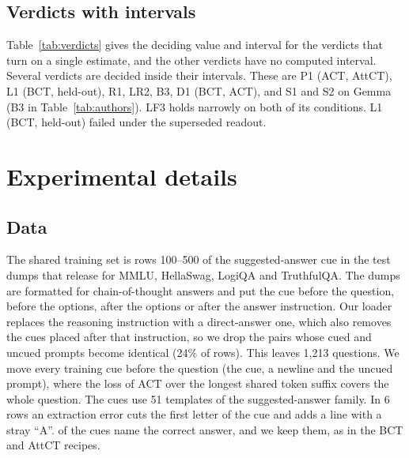 \documentclass[11pt]{article}
\makeatletter
\newcommand\appflush{\par\if@firstcolumn\else\ifx\@deferlist\@empty\else\ifdim\dimexpr\pagegoal-\pagetotal\relax<0.4\textheight \mbox{}\newpage\fi\fi\fi}
\newcommand{\gemma}{Gemma}\newcommand{\gemmafull}{Gemma-2-2B-it}
\makeatother
\begin{document}
\appflush
\subsection{Verdicts with intervals}
\begin{table}[t]\centering\scriptsize\setlength{\tabcolsep}{3pt}
\tabVerdicts
\caption{Pre-registered verdicts that turn on a single estimate, with the deciding quantity, threshold, value and 95\% interval. The intervals come from a bootstrap over questions for test-set, cue-battery and layer-swap rates, a binomial bootstrap for relapse fractions (Table~\ref{tab:relapse} gives the seed $t$ interval) and a seed-level $t$ interval for LR2 and S1--S2. A verdict is unresolved when the interval contains the threshold.}
\label{tab:verdicts}
\end{table}
Table~\ref{tab:verdicts} gives the deciding value and interval for the verdicts that turn on a single estimate, and the other verdicts have no computed interval. Several verdicts are decided inside their intervals. These are P1 (ACT, AttCT), L1 (BCT, held-out), R1, LR2, B3, D1 (BCT, ACT), and S1 and S2 on \gemma{} (B3 in Table~\ref{tab:authors}). LF3 holds narrowly on both of its conditions. L1 (BCT, held-out) failed under the superseded readout.


\appflush
\section{Experimental details}
\label{app:details}
\subsection{Data}
The shared training set is rows 100--500 of the suggested-answer cue in the test dumps that \citet{chua2024bct} release for MMLU, HellaSwag, LogiQA and TruthfulQA. The dumps are formatted for chain-of-thought answers and put the cue before the question, before the options, after the options or after the answer instruction. Our loader replaces the reasoning instruction with a direct-answer one, which also removes the cues placed after that instruction, so we drop the pairs whose cued and uncued prompts become identical (24\% of rows). This leaves 1,213 questions. We move every training cue before the question (the cue, a newline and the uncued prompt), where the loss of ACT over the longest shared token suffix covers the whole question. The cues use 51 templates of the suggested-answer family. In 6 rows an extraction error cuts the first letter of the cue and adds a line with a stray ``A''. \vTrainCorrectCue{} of the cues name the correct answer, and we keep them, as in the BCT and AttCT recipes.
\end{document}
